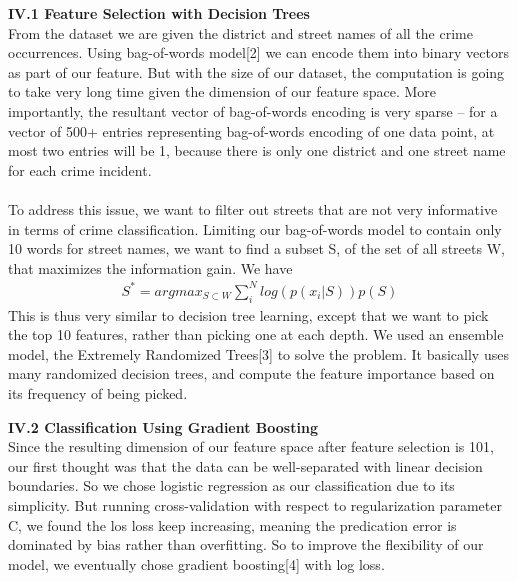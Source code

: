 \documentclass[12pt]{article}
\newenvironment{p3}[2][Part IV Methods]{\begin{trivlist}
\item[\hskip \labelsep {\bfseries #1}\hskip \labelsep {\bfseries #2}]}{\end{trivlist}}
\begin{document}
\begin{p3}{}
\item{\textbf{IV.1 Feature Selection with Decision Trees\\}}
From the dataset we are given the district and street names of all the crime occurrences. Using bag-of-words model[2] we can encode them into binary vectors as part of our feature. But with the size of our dataset, the computation is going to take very long time given the dimension of our feature space. More importantly, the resultant vector of bag-of-words encoding is very sparse -- for a vector of 500+ entries representing bag-of-words encoding of one data point, at most two entries will be 1, because there is only one district and one street name for each crime incident.\\\\
To address this issue, we want to filter out streets that are not very informative in terms of crime classification. Limiting our bag-of-words model to contain only 10 words for street names, we want to find a subset S, of the set of all streets W, that maximizes the information gain. We have
\begin{align*}
	S^* = argmax_{S \subset W} \sum_i^N log(p(x_i|S)) p(S)
\end{align*}
This is thus very similar to decision tree learning, except that we want to pick the top 10 features, rather than picking one at each depth. We used an ensemble model, the Extremely Randomized Trees[3] to solve the problem. It basically uses many randomized decision trees, and compute the feature importance based on its frequency of being picked.\\

\item{\textbf{IV.2 Classification Using Gradient Boosting\\}}
Since the resulting dimension of our feature space after feature selection is 101, our first thought was that the data can be well-separated with linear decision boundaries. So we chose logistic regression as our classification due to its simplicity. But running cross-validation with respect to regularization parameter C, we found the los loss keep increasing, meaning the predication error is dominated by bias rather than overfitting. So to improve the flexibility of our model, we eventually chose gradient boosting[4] with log loss.
\end{p3}
\end{document}
